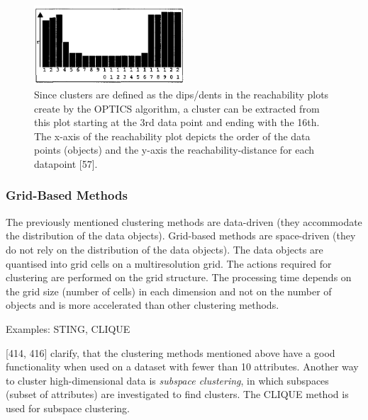 \begin{figure}
  \centering
  \includegraphics[width=0.5\textwidth]{./images/clusterExtractionOPTICS.png}
  \caption{Since clusters are defined as the dips/dents in the reachability plots create by the OPTICS algorithm, a cluster can be extracted from this plot starting at the 3rd data point and ending with the 16th. The x-axis of the reachability plot depicts the order of the data points (objects) and the y-axis the reachability-distance for each datapoint \autocite{OPTICS}[57].}
  \label{figure:clusterExtractionOPTICS}
\end{figure}


 

  \subsubsection{Grid-Based Methods}
  The previously mentioned clustering methods are data-driven (they accommodate the distribution of the data objects). Grid-based methods are space-driven (they do not rely on the distribution of the data objects). The data objects are quantised into grid cells on a multiresolution grid. The actions required for clustering are performed on the grid structure. The processing time depends on the grid size (number of cells) in each dimension and not on the number of objects and is more accelerated than other clustering methods.
  
  Examples: STING, CLIQUE

  \vspace{5mm} %
\textcite{han2011data}[414, 416] clarify, that the clustering methods mentioned above have a good functionality when used on a dataset with fewer than 10 attributes. Another way to cluster high-dimensional data is \textit{subspace clustering}, in which subspaces (subset of attributes) are investigated to find clusters. The CLIQUE method is used for subspace clustering. 


